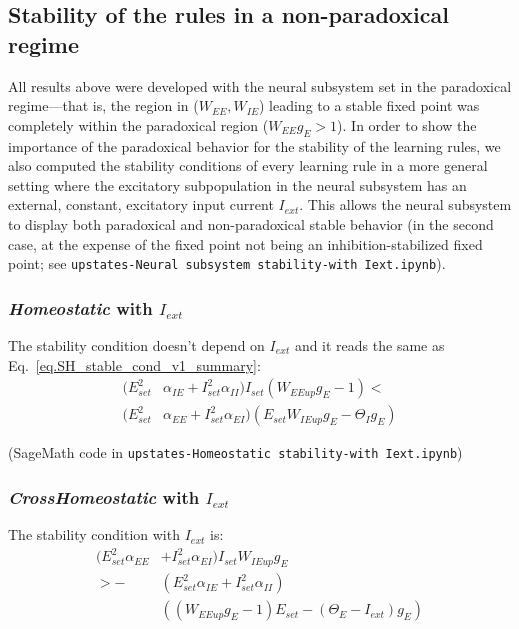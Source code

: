 \documentclass[twocolumn]{article}
\newcommand{\EE}{\mathit{EE}}
\newcommand{\EI}{\mathit{EI}}
\newcommand{\IE}{\mathit{IE}}
\newcommand{\II}{\mathit{II}}
\newcommand{\set}{\mathit{set}}
\newcommand{\ext}{\mathit{ext}}
\newcommand{\up}{\mathit{up}}
\begin{document}
\subsection{Stability of the rules in a non-paradoxical regime}
\label{sec.nonparadoxical}

All results above were developed with the neural subsystem set in the paradoxical regime---that is, the region in ($W_{\EE},W_{\IE}$) leading to a stable fixed point was completely within the paradoxical region ($W_{\EE}g_E > 1$). In order to show the importance of the paradoxical behavior for the stability of the learning rules, we also computed the stability conditions of every learning rule in a more general setting where the excitatory subpopulation in the neural subsystem has an external, constant, excitatory input current $I_{\ext}$. This allows the neural subsystem to display both paradoxical and non-paradoxical stable behavior (in the second case, at the expense of the fixed point not being an inhibition-stabilized fixed point; see {\tt upstates-Neural subsystem stability-with Iext.ipynb}).


\subsubsection{{\em Homeostatic} with $I_{\ext}$}

The stability condition doesn't depend on $I_{\ext}$ and it reads the same as Eq.\ \ref{eq.SH_stable_cond_v1_summary}:
\begin{equation}
\begin{aligned}
(E_{\set}^2 & \alpha_{\IE} + I_{\set}^2 \alpha_{\II}) I_{\set}(W_{\EE\up} g_E - 1) < \\
(E_{\set}^2 & \alpha_{\EE} + I_{\set}^2 \alpha_{\EI}) (E_{\set} W_{\IE\up} g_E - \Theta_I g_E)
\end{aligned}
\label{eq.SH_stable_cond_nonparadox}
\end{equation}

(SageMath code in {\tt upstates-Homeostatic stability-with Iext.ipynb})


\subsubsection{{\em CrossHomeostatic} with $I_{\ext}$}

The stability condition with $I_{\ext}$ is:
\begin{equation}
\begin{aligned}
(E_{\set}^2 \alpha_{\EE} & + I_{\set}^2 \alpha_{\EI}) I_{\set} W_{\IE\up} g_E \\
> - & 
(E_{\set}^2 \alpha_{\IE} + I_{\set}^2 \alpha_{\II}) \\
& ((W_{\EE\up} g_E - 1)E_{\set} - (\Theta_E - I_{\ext}) g_E)
\end{aligned}
\label{eq.CH_stable_cond_v1_nonparadox}
\end{equation}
\end{document}
